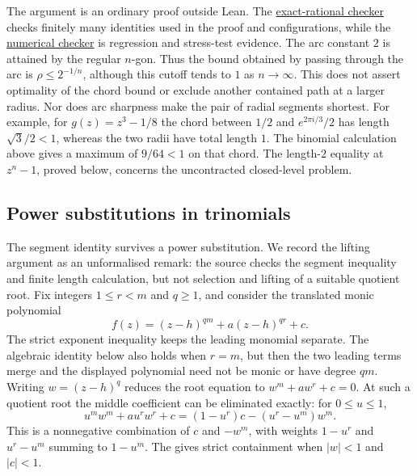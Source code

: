The argument is an ordinary proof outside Lean.  The
\href{https://github.com/wcook04/plectis-erdos/blob/f214a6b45528dc5eefe20ffadc35f2e981627d4c/research_corpus/Erdos1041/scripts/check_erdos1041_concyclic_exact_witness.py}{exact-rational checker}
checks finitely many identities used in the proof and configurations, while the
\href{https://github.com/wcook04/plectis-erdos/blob/f214a6b45528dc5eefe20ffadc35f2e981627d4c/research_corpus/Erdos1041/scripts/check_erdos1041_concyclic_alternation.py}{numerical checker}
is regression and stress-test evidence. The arc constant $2$ is attained
by the regular $n$-gon. Thus the bound obtained by passing through the
arc is $\rho\le2^{-1/n}$, although this cutoff tends to $1$ as
$n\to\infty$. This does not assert optimality of the chord bound or
exclude another contained path at a larger radius. Nor does arc
sharpness make the pair of radial segments shortest. For example, for
$g(z)=z^3-1/8$ the chord between $1/2$ and $e^{2\pi i/3}/2$ has length
$\sqrt3/2<1$, whereas the two radii have total length $1$. The binomial
calculation above gives a maximum of $9/64<1$ on that chord. The
length-$2$ equality at $z^n-1$, proved below, concerns the uncontracted
closed-level problem.

\subsection*{Power substitutions in trinomials}

The segment identity survives a power substitution. We record the
lifting argument as an unformalised remark: the source checks the
segment inequality and finite length calculation, but not selection
and lifting of a suitable quotient root. Fix
integers $1\le r<m$ and $q\ge1$, and consider the translated monic polynomial
\[
 f(z)=(z-h)^{qm}+a(z-h)^{qr}+c.
\]
The strict exponent inequality keeps the leading monomial separate.
The algebraic identity below also holds when $r=m$, but then the two
leading terms merge and the displayed polynomial need not be monic or
have degree $qm$.
Writing $w=(z-h)^q$ reduces the root equation to
$w^m+aw^r+c=0$.  At such a quotient root the middle coefficient can be
eliminated exactly: for $0\le u\le1$,
\[
 u^mw^m+au^rw^r+c
   =(1-u^r)c-(u^r-u^m)w^m.
\]
This is a nonnegative combination of $c$ and $-w^m$, with weights
$1-u^r$ and $u^r-u^m$ summing to $1-u^m$. The
gives strict containment when $|w|<1$ and $|c|<1$.

